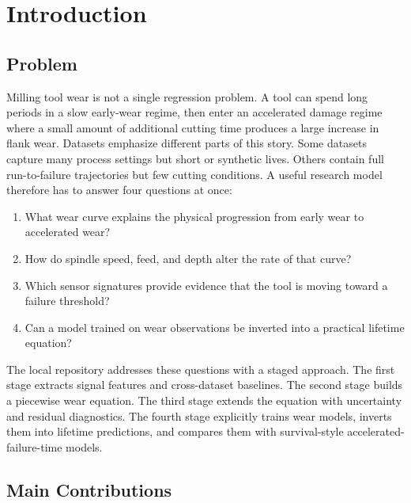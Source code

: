 \documentclass[11pt,a4paper]{article}
\begin{document}
\section{Introduction}

\subsection{Problem}

Milling tool wear is not a single regression problem. A tool can spend long periods in a slow early-wear regime, then enter an accelerated damage regime where a small amount of additional cutting time produces a large increase in flank wear. Datasets emphasize different parts of this story. Some datasets capture many process settings but short or synthetic lives. Others contain full run-to-failure trajectories but few cutting conditions. A useful research model therefore has to answer four questions at once:

\begin{enumerate}
  \item What wear curve explains the physical progression from early wear to accelerated wear?
  \item How do spindle speed, feed, and depth alter the rate of that curve?
  \item Which sensor signatures provide evidence that the tool is moving toward a failure threshold?
  \item Can a model trained on wear observations be inverted into a practical lifetime equation?
\end{enumerate}

The local repository addresses these questions with a staged approach. The first stage extracts signal features and cross-dataset baselines. The second stage builds a piecewise wear equation. The third stage extends the equation with uncertainty and residual diagnostics. The fourth stage explicitly trains wear models, inverts them into lifetime predictions, and compares them with survival-style accelerated-failure-time models.

\subsection{Main Contributions}
\end{document}
